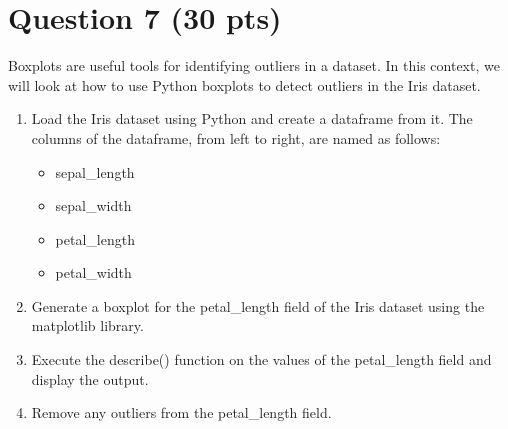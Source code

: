 \pagebreak
\section{Question 7 \normalsize(30 pts)}

\begin{question}
	Boxplots are useful tools for identifying outliers in a dataset. In this context, we will look at how to use Python boxplots to detect outliers in the Iris dataset.
	\begin{enumerate}
		\item Load the Iris dataset using Python and create a dataframe from it. The columns of the dataframe, from left to right, are named as follows:
		\begin{itemize}
			\item sepal\_length
			\item sepal\_width
			\item petal\_length
			\item petal\_width
		\end{itemize}
		\item Generate a boxplot for the petal\_length field of the Iris dataset using the matplotlib library.
		\item Execute the describe() function on the values of the petal\_length field and display the output.
		\item Remove any outliers from the petal\_length field.
	\end{enumerate}
\end{question}

